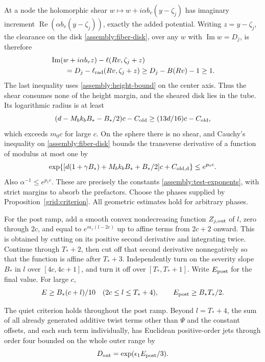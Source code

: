 At a node the holomorphic shear
$w\mapsto w+i\alpha b_v(y-\zeta_j)$ has imaginary increment
$\operatorname{Re}(\alpha b_v(y-\zeta_j))$, exactly the added
potential. Writing $z=y-\zeta_j$, the clearance on the disk
\eqref{assembly:fiber-disk}, over any $w$ with
$\operatorname{Im}w=D_j$, is therefore
\[
 \begin{split}
 &\operatorname{Im}(w+i\alpha b_vz)
       -\ell(Rv,\zeta_j+z)\\
 &\qquad=D_j-\ell_{\rm rad}(Rv,\zeta_j+z)
       \geq D_j-B(Rv)-1\geq1.
 \end{split}
\]
The last inequality uses \eqref{assembly:height-bound} on the center
axis. Thus the shear consumes none of the height margin, and the
sheared disk lies in the tube. Its logarithmic radius is at least
\[
 (d-M_bk_bB_*-B_*/2)c-C_{\rm old}
 \geq(13d/16)c-C_{\rm old},
\]
which exceeds $m_0c$ for large $c$.
On the sphere there is no shear, and Cauchy's inequality on
\eqref{assembly:fiber-disk} bounds the transverse derivative
of a function of modulus at most one by
\[
 \exp\{[d(1+\gamma B_*)+M_bk_bB_*+B_*/2]c+C_{\rm old,d}\}
 \leq e^{p_0c}.
\]
Also $\alpha^{-1}\leq e^{p_1c}$.
These are precisely the constants \eqref{assembly:test-exponents},
with strict margins to absorb the prefactors.
Choose the phases supplied by Proposition~\ref{grid:criterion}.
All geometric estimates hold for arbitrary phases.

For the post ramp, add a smooth convex nondecreasing function
$Z_{j,\rm out}$ of $l$, zero through $2c$, and equal to
$e^{m_z(l-2c)}$ up to affine terms from $2c+2$ onward.
This is obtained by cutting on its positive second derivative and
integrating twice. Continue through $T_*+2$, then cut off that
second derivative nonnegatively so that the function is affine
after $T_*+3$. Independently turn on the severity slope $B_*$
in $l$ over $[4c,4c+1]$, and turn it off over
$[T_*,T_*+1]$. Write $E_{\rm post}$ for the final value.
For large $c$,
\begin{equation}\label{assembly:post-severity}
 E\geq B_*(c+l)/10\quad(2c\leq l\leq T_*+4),\qquad
 E_{\rm post}\geq B_*T_*/2.
\end{equation}

\begin{lemma}\label{assembly:post}
The quiet criterion holds throughout the post ramp.
Beyond $l=T_*+4$, the sum of all already generated additive twist
terms other than $\Psi$ and the constant offsets, and each such
term individually, has Euclidean positive-order jets through order
four bounded on the whole outer range by
\begin{equation}\label{assembly:outer-bound}
 D_{\rm out}=\exp(\epsilon_1E_{\rm post}/3).
\end{equation}
\end{lemma}

